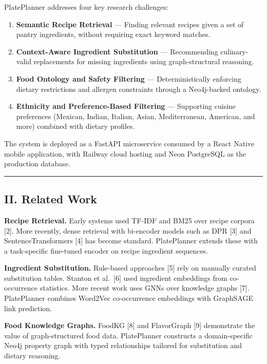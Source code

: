 \documentclass[10pt,conference,compsoc]{IEEEtran}
\begin{document}
PlatePlanner addresses four key research challenges:

\begin{enumerate}
\def\labelenumi{\arabic{enumi}.}
\tightlist
\item
  \textbf{Semantic Recipe Retrieval} --- Finding relevant recipes given
  a set of pantry ingredients, without requiring exact keyword matches.
\item
  \textbf{Context-Aware Ingredient Substitution} --- Recommending
  culinary-valid replacements for missing ingredients using
  graph-structural reasoning.
\item
  \textbf{Food Ontology and Safety Filtering} --- Deterministically
  enforcing dietary restrictions and allergen constraints through a
  Neo4j-backed ontology.
\item
  \textbf{Ethnicity and Preference-Based Filtering} --- Supporting
  cuisine preferences (Mexican, Indian, Italian, Asian, Mediterranean,
  American, and more) combined with dietary profiles.
\end{enumerate}

The system is deployed as a FastAPI microservice consumed by a React
Native mobile application, with Railway cloud hosting and Neon
PostgreSQL as the production database.

\begin{center}\rule{0.5\linewidth}{0.5pt}\end{center}

\subsection{II. Related Work}\label{ii.-related-work}

\textbf{Recipe Retrieval.} Early systems used TF-IDF and BM25 over
recipe corpora {[}2{]}. More recently, dense retrieval with bi-encoder
models such as DPR {[}3{]} and SentenceTransformers {[}4{]} has become
standard. PlatePlanner extends these with a task-specific fine-tuned
encoder on recipe ingredient sequences.

\textbf{Ingredient Substitution.} Rule-based approaches {[}5{]} rely on
manually curated substitution tables. Stanton et al.~{[}6{]} used
ingredient embeddings from co-occurrence statistics. More recent work
uses GNNs over knowledge graphs {[}7{]}. PlatePlanner combines Word2Vec
co-occurrence embeddings with GraphSAGE link prediction.

\textbf{Food Knowledge Graphs.} FoodKG {[}8{]} and FlavorGraph {[}9{]}
demonstrate the value of graph-structured food data. PlatePlanner
constructs a domain-specific Neo4j property graph with typed
relationships tailored for substitution and dietary reasoning.
\end{document}

